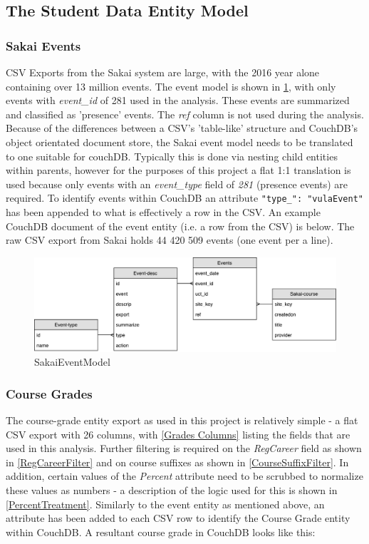 \subsection{The Student Data Entity Model}

\subsubsection*{Sakai Events}
CSV Exports from the Sakai system are large, with the 2016 year alone containing over 13 million events. The event model is shown in \ref{SakaiEventModel}, with only events with \textit{event\_id} of 281 used in the analysis. These events are summarized and classified as 'presence' events. The \textit{ref} column is not used during the analysis. Because of the differences between a CSV's 'table-like' structure and CouchDB's object orientated document store, the Sakai event model needs to be translated to one suitable for couchDB. Typically this is done via nesting child entities within parents, however for the purposes of this project a flat 1:1 translation is used because only events with an \textit{event\_type} field of \textit{281} (presence events) are required. To identify events within CouchDB an attribute \texttt{{"type\_": "vulaEvent"}} has been appended to what is effectively a row in the CSV. An example CouchDB document of the event entity (i.e. a row from the CSV) is below. The raw CSV export from Sakai holds 44 420 509 events (one event per a line).

\begin{figure}[h]
  \centering
  \includegraphics[scale=0.4]{./resources/figures/SakaiEvents}
  \caption[SakaiEventModel]{SakaiEventModel}
  \label{SakaiEventModel}
\end{figure}

\subsubsection*{Course Grades}
The course-grade entity export as used in this project is relatively simple - a flat CSV export with 26 columns, with \ref{Grades Columns} listing the fields that are used in this analysis. Further filtering is required on the \textit{RegCareer} field as shown in \ref{RegCareerFilter} and on course suffixes as shown in \ref{CourseSuffixFilter}. In addition, certain values of the \textit{Percent} attribute need to be scrubbed to normalize these values as numbers - a description of the logic used for this is shown in \ref{PercentTreatment}. Similarly to the event entity as mentioned above, an attribute has been added to each CSV row to identify the Course Grade entity within CouchDB. A resultant course grade in CouchDB looks like this:




